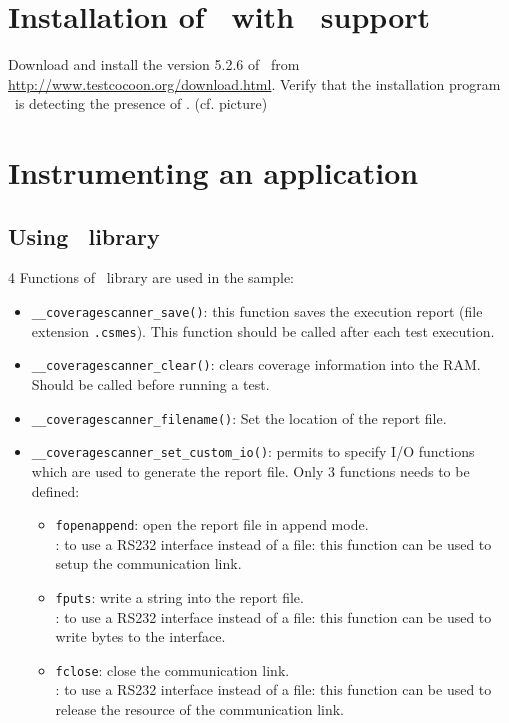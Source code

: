 \section{Installation of \TestCocoon\ with \VisualDSP\ support}

Download and install the version 5.2.6 of \TestCocoon\ from \url{http://www.testcocoon.org/download.html}.
Verify that the installation program \TestCocoon\ is detecting the presence of \VisualDSP. (cf. picture)


\section{Instrumenting an application}
\subsection{Using \CoverageScanner\ library}

4 Functions of \CoverageScanner\ library are used in the sample:
\begin{itemize}
\item \verb$__coveragescanner_save()$: this function saves the execution report (file extension \verb$.csmes$).
           This function should be called after each test execution.
\item \verb$__coveragescanner_clear()$: clears coverage information into the RAM. Should be called before running a test.
\item \verb$__coveragescanner_filename()$: Set the location of the report file.
\item \verb$__coveragescanner_set_custom_io()$: permits to specify I/O functions which are used to generate the report file.
           Only 3 functions needs to be defined: 
      \begin{itemize}
           \item \verb$fopenappend$: open the report file in append mode. \\
                                     \forExample: to use a RS232 interface instead of a file: this function can be used to setup the communication link.
           \item \verb$fputs$: write a string into the report file. \\
                                     \forExample: to use a RS232 interface instead of a file: this function can be used to write bytes to the interface.
           \item \verb$fclose$: close the communication link. \\
                                     \forExample: to use a RS232 interface instead of a file: this function can be used to release the resource of the communication link.
      \end{itemize}
\end{itemize}

